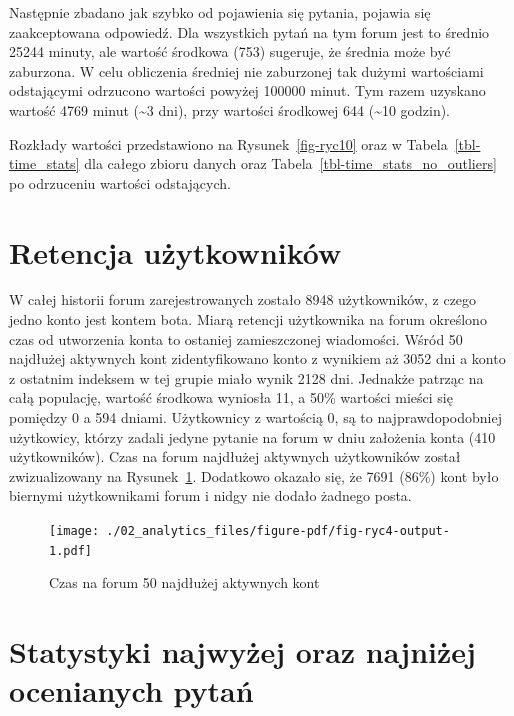 \documentclass[
  letterpaper,
  DIV=11,
  numbers=noendperiod]{scrreprt}
\begin{document}
Następnie zbadano jak szybko od pojawienia się pytania, pojawia się
zaakceptowana odpowiedź. Dla wszystkich pytań na tym forum jest to
średnio 25244 minuty, ale wartość środkowa (753) sugeruje, że średnia
może być zaburzona. W celu obliczenia średniej nie zaburzonej tak dużymi
wartościami odstającymi odrzucono wartości powyżej 100000 minut. Tym
razem uzyskano wartość 4769 minut (\textasciitilde3 dni), przy wartości
środkowej 644 (\textasciitilde10 godzin).

Rozkłady wartości przedstawiono na Rysunek~\ref{fig-ryc10} oraz w
Tabela~\ref{tbl-time_stats} dla całego zbioru danych oraz
Tabela~\ref{tbl-time_stats_no_outliers} po odrzuceniu wartości
odstających.

\hypertarget{retencja-uux17cytkownikuxf3w}{%
\section{Retencja użytkowników}\label{retencja-uux17cytkownikuxf3w}}

W całej historii forum zarejestrowanych zostało 8948 użytkowników, z
czego jedno konto jest kontem bota. Miarą retencji użytkownika na forum
określono czas od utworzenia konta to ostaniej zamieszczonej wiadomości.
Wśród 50 najdłużej aktywnych kont zidentyfikowano konto z wynikiem aż
3052 dni a konto z ostatnim indeksem w tej grupie miało wynik 2128 dni.
Jednakże patrząc na całą populację, wartość środkowa wyniosła 11, a 50\%
wartości mieści się pomiędzy 0 a 594 dniami. Użytkownicy z wartością 0,
są to najprawdopodobniej użytkowicy, którzy zadali jedyne pytanie na
forum w dniu założenia konta (410 użytkowników). Czas na forum najdłużej
aktywnych użytkowników został zwizualizowany na Rysunek~\ref{fig-ryc4}.
Dodatkowo okazało się, że 7691 (86\%) kont było biernymi użytkownikami
forum i nidgy nie dodało żadnego posta.

\begin{figure}

{\centering \texttt{[image: ./02\_analytics\_files/figure-pdf/fig-ryc4-output-1.pdf]}

}

\caption{\label{fig-ryc4}Czas na forum 50 najdłużej aktywnych kont}

\end{figure}

\hypertarget{sec-qstats}{%
\section{Statystyki najwyżej oraz najniżej ocenianych
pytań}\label{sec-qstats}}
\end{document}

